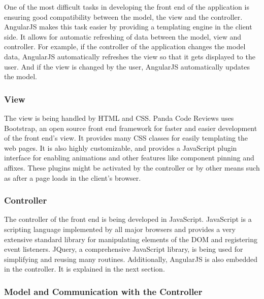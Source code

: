 One of the most difficult tasks in developing the front end of the application
is ensuring good compatibility between the model, the view and the controller.
AngularJS makes this task easier by providing a templating engine in the client
side. It allows for automatic refreshing of data between the model, view and
controller. For example, if the controller of the application changes the model
data, AngularJS automatically refreshes the view so that it gets displayed to
the user. And if the view is changed by the user, AngularJS automatically
updates the model.

\subsubsection{View}

The view is being handled by HTML and CSS. Panda Code Reviews uses
Bootstrap\cite{bootstrap}, an open source front end framework for faster and
easier development of the front end's view. It provides many CSS classes for
easily templating the web pages. It is also highly customizable, and provides a
JavaScript plugin interface for enabling animations and other features like
component pinning and affixes. These plugins might be activated by the
controller or by other means such as after a page loads in the client's browser.

\subsubsection{Controller}

The controller of the front end is being developed in JavaScript. JavaScript is
a scripting language implemented by all major browsers and provides a very
extensive standard library for manipulating elements of the DOM and registering
event listeners. JQuery\cite{jquery}, a comprehensive JavaScript library, is
being used for simplifying and reusing many routines. Additionally, AngularJS is
also embedded in the controller. It is explained in the next section.

\subsubsection{Model and Communication with the Controller}

